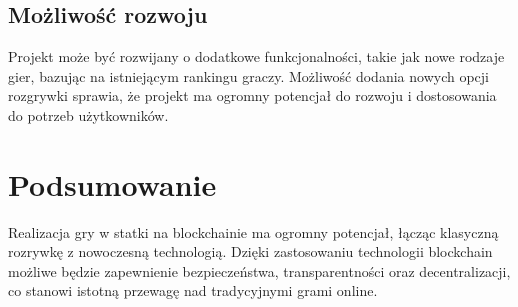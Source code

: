 \documentclass{article}
\begin{document}
\subsection{Możliwość rozwoju}

Projekt może być rozwijany o dodatkowe funkcjonalności, takie jak nowe rodzaje gier, bazując na istniejącym rankingu graczy. Możliwość dodania nowych opcji rozgrywki sprawia, że projekt ma ogromny potencjał do rozwoju i dostosowania do potrzeb użytkowników.

\section{Podsumowanie}

Realizacja gry w statki na blockchainie ma ogromny potencjał, łącząc klasyczną rozrywkę z nowoczesną technologią. Dzięki zastosowaniu technologii blockchain możliwe będzie zapewnienie bezpieczeństwa, transparentności oraz decentralizacji, co stanowi istotną przewagę nad tradycyjnymi grami online.
\end{document}
